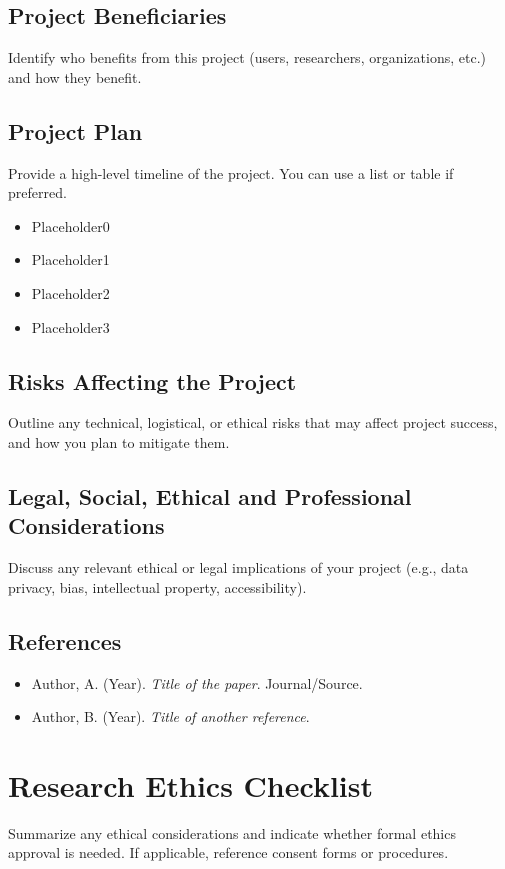 \documentclass[12pt,a4paper]{article}
\begin{document}
\subsection{Project Beneficiaries}
Identify who benefits from this project (users, researchers, organizations, etc.) and how they benefit.

\subsection{Project Plan}
Provide a high-level timeline of the project. You can use a list or table if preferred.

\begin{itemize}[noitemsep]
    \item Placeholder0
    \item Placeholder1
    \item Placeholder2
    \item Placeholder3
\end{itemize}

\subsection{Risks Affecting the Project}
Outline any technical, logistical, or ethical risks that may affect project success, and how you plan to mitigate them.

\subsection{Legal, Social, Ethical and Professional Considerations}
Discuss any relevant ethical or legal implications of your project (e.g., data privacy, bias, intellectual property, accessibility).

\subsection{References}
\begin{itemize}[noitemsep]
    \item Author, A. (Year). \textit{Title of the paper}. Journal/Source.
    \item Author, B. (Year). \textit{Title of another reference}.
\end{itemize}

\newpage
\section{Research Ethics Checklist}
Summarize any ethical considerations and indicate whether formal ethics approval is needed. If applicable, reference consent forms or procedures.
\end{document}
